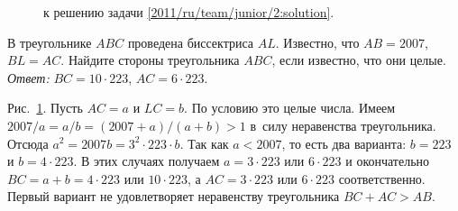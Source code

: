 \ifsolution
\begin{figure}\centering
    \caption{к решению задачи \ref{2011/ru/team/junior/2:solution}.}
    \label{2011/ru/team/junior/2:solution:fig}
\end{figure}%
\fi %

\problem{}
В треугольнике $ABC$ проведена биссектриса $AL$.
Известно, что $AB = 2007$, $BL = AC$.
Найдите стороны треугольника $ABC$, если известно, что они целые.
\solution
\label{2011/ru/team/junior/2:solution}%
\emph{Ответ:} $BC = 10 \cdot 223$, $AC = 6 \cdot 223$.
\par
Рис.~\ref{2011/ru/team/junior/2:solution:fig}.
Пусть $AC = a$ и $LC = b$.
По условию это целые числа.
Имеем $2007 / a = a / b = (2007 + a) / (a + b) > 1$ в~силу неравенства
треугольника.
Отсюда $a^2 = 2007 b = 3^2 \cdot 223 \cdot b$.
Так как  $a < 2007$, то есть два варианта:
$b = 223$ и $b = 4 \cdot 223$.
В этих случаях получаем $a = 3 \cdot 223$ или $6 \cdot 223$ и окончательно
$BC = a + b = 4 \cdot 223$ или $10 \cdot 223$, а $AC = 3 \cdot 223$ или
$6 \cdot 223$ соответственно.
Первый вариант не удовлетворяет неравенству треугольника $BC + AC > AB$.
\endproblem
